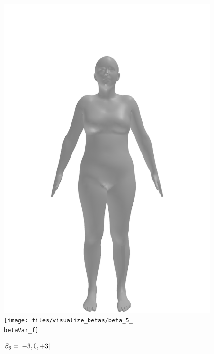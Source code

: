 \begin{figure}[ht!]
\begin{minipage}[b]{\textwidth}
        \includegraphics[width=\imgWidth]{files/visualize_betas/baseline_f}
        \texttt{[image: files/visualize\_betas/beta\_5\_\\betaVar\_f]}
        \caption[Effect of varying $\beta_6$ in SMPL]{$\beta_6 = [-3, 0, +3]$}
    \end{minipage}
\end{figure}

